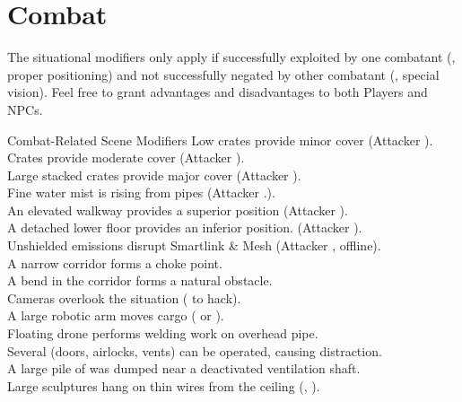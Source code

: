 
\section*{Combat}

The situational modifiers only apply if successfully exploited by
one combatant (\eg, proper positioning) and not successfully negated
by other combatant (\eg, special vision).
%
Feel free to grant advantages and disadvantages to both Players and NPCs.

\begin{tableone}{Combat-Related Scene Modifiers}
Low crates provide minor cover (Attacker ).\\
Crates provide moderate cover (Attacker ).\\
Large stacked crates provide major cover (Attacker ).\\
Fine water mist is rising from pipes (Attacker .).\\
An elevated walkway provides a superior position (Attacker ).\\
A detached lower floor provides an inferior position. (Attacker ).\\
Unshielded emissions disrupt Smartlink \& Mesh (Attacker , offline).\\
A narrow corridor forms a choke point.\\
A bend in the corridor forms a natural obstacle.\\

Cameras overlook the situation ( to hack).\\
A large robotic arm moves cargo ( or ).\\
Floating drone performs welding work on overhead pipe.\\
Several (doors, airlocks, vents) can be operated, causing distraction.\\
A large pile of  was dumped near a deactivated ventilation shaft.\\

Large sculptures hang on thin wires from the ceiling (, ).\\

\end{tableone}



